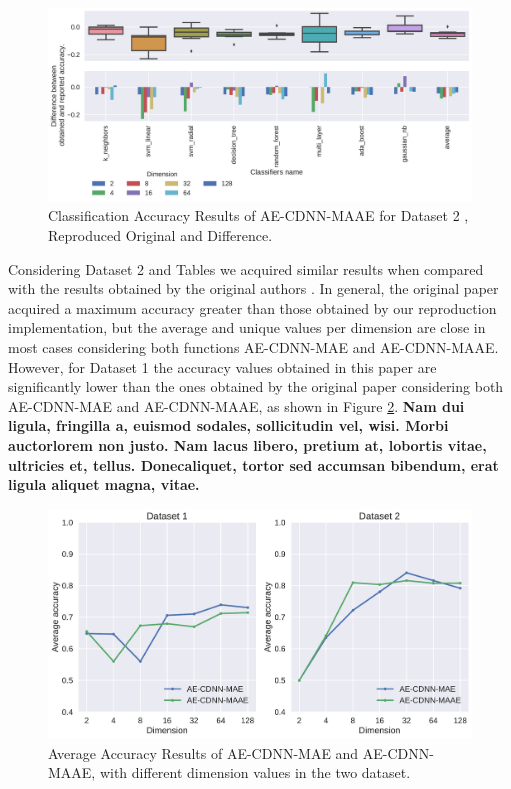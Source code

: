 \begin{figure}[!ht]
    \centering
    \includegraphics[width=\linewidth]{figure/table_5.pdf}
    \caption{Classification Accuracy Results of AE-CDNN-MAAE for Dataset 2 \cite{WenZha:2018}, Reproduced Original and Difference.}
\label{fig:acc-AE-CDNN-MAAE-d2}
\end{figure}


\newpage

Considering Dataset 2 and Tables we acquired similar results when compared with the results obtained by the original authors \cite{WenZha:2018}. In general, the original paper acquired a maximum accuracy greater than those obtained by our reproduction implementation, but the average and unique values per dimension are close in most cases considering both functions AE-CDNN-MAE and AE-CDNN-MAAE. However, for Dataset 1 the accuracy values obtained in this paper are significantly lower than the ones obtained by the original paper considering both AE-CDNN-MAE and AE-CDNN-MAAE, as shown in Figure \ref{fig:average}. \textbf{Nam dui ligula, fringilla a, euismod sodales, sollicitudin vel, wisi. Morbi auctorlorem non justo. Nam lacus libero, pretium at, lobortis vitae, ultricies et, tellus. Donecaliquet, tortor sed accumsan bibendum, erat ligula aliquet magna, vitae.} 


\begin{figure}[!ht]
\centering
\includegraphics[width=0.8\linewidth]{figure/average.pdf}
    \caption{Average Accuracy Results of AE-CDNN-MAE and AE-CDNN-MAAE, with different dimension values in the two dataset.}
\label{fig:average}
\end{figure}

